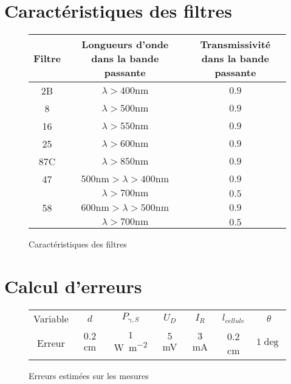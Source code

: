 \section{Caractéristiques des filtres}

\begin{figure}[H]
\centering
\begin{tabulary}{0.8\linewidth}{C C C}
    \toprule
    Filtre & Longueurs d'onde dans la bande passante & Transmissivité dans la bande passante \\
    \midrule
    2B  & $\lambda > 400 \unit{\nano \metre}$ & $0.9$ \\
    8   & $\lambda > 500 \unit{\nano \metre}$ & $0.9$ \\
    16  & $\lambda > 550 \unit{\nano \metre}$ & $0.9$ \\
    25  & $\lambda > 600 \unit{\nano \metre}$ & $0.9$ \\
    87C & $\lambda > 850 \unit{\nano \metre}$ & $0.9$ \\
    47  & $500 \unit{\nano \metre} > \lambda > 400 \unit{\nano \metre}$ & $0.9$ \\
        & $\lambda > 700 \unit{\nano \metre}$ & $0.5$ \\
    58  & $600 \unit{\nano \metre} > \lambda > 500 \unit{\nano \metre}$ & $0.9$ \\
        & $\lambda > 700 \unit{\nano \metre}$ & $0.5$ \\
    \bottomrule
    \end{tabulary}
    \caption{Caractéristiques des filtres \cite{notice}}
    \label{tab:filters}
\end{figure}

\section{Calcul d'erreurs}

\begin{figure}[H]
    \centering
    \begin{tabulary}{0.7\linewidth}{C C C C C C C}
        \toprule
        Variable & \(d\)      & \(P_{\gamma,S}\) & \(U_D\)   & \(I_R\)  & \(l_{cellule}\) & \(\theta\) \\
        Erreur   & \(0.2\) cm & \(1\) \unit{\watt \per \square \meter}        & \(5\) \unit{\milli\volt} & \(3\) \unit{\milli\ampere} & 0.2 \unit{\centi\meter}      & \(1 \deg\) \\
        \bottomrule
    \end{tabulary}
    \caption{Erreurs estimées sur les mesures}
    \label{tab:erreurs}
\end{figure}

